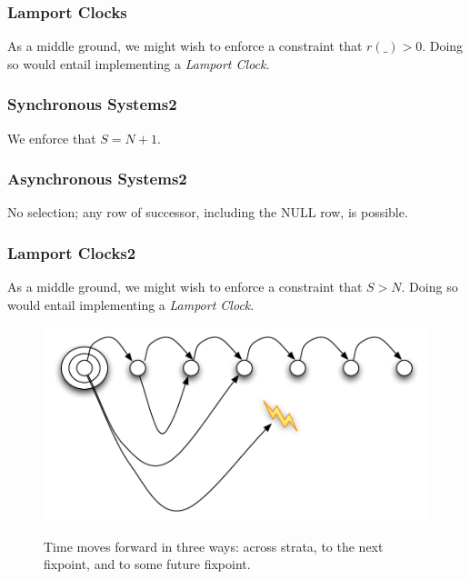 \subsubsection{Lamport Clocks}

As a middle ground, we might wish to enforce a constraint that $r(\_) > 0$.  Doing so would entail implementing a \emph{Lamport Clock}. 


\subsubsection{Synchronous Systems2}

We enforce that $S = N + 1$.

\subsubsection{Asynchronous Systems2}

No selection; any row of successor, including the NULL row, is possible.

\subsubsection{Lamport Clocks2}

As a middle ground, we might wish to enforce a constraint that $S > N$.  Doing so would entail implementing a \emph{Lamport Clock}. 


\begin{figure}[t]
  \centering
  \includegraphics[width=0.75\linewidth]{dedalus-time.pdf}
  \label{fig:dedalus-time}
  \caption{Time moves forward in three ways: across strata, to the next fixpoint, and to some future fixpoint.}
\vspace{-8pt}
\end{figure}



